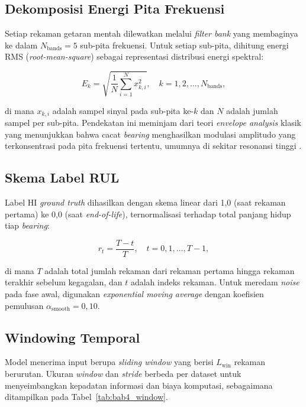 \subsection{Dekomposisi Energi Pita Frekuensi}
\label{subsec:bab4_bandenergi}

Setiap rekaman getaran mentah dilewatkan melalui \emph{filter bank} yang
membaginya ke dalam $N_{\text{bands}} = 5$ sub-pita frekuensi.
Untuk setiap sub-pita, dihitung energi RMS (\emph{root-mean-square})
sebagai representasi distribusi energi spektral:

\begin{equation}\label{eq:bab4_band_energy}
E_{k} = \sqrt{\frac{1}{N}\sum_{i=1}^{N} x_{k,i}^{2}}, \quad k = 1, 2, \ldots, N_{\text{bands}},
\end{equation}

\noindent di mana $x_{k,i}$ adalah sampel sinyal pada sub-pita ke-$k$
dan $N$ adalah jumlah sampel per sub-pita.
Pendekatan ini meminjam dari teori \emph{envelope analysis} klasik yang
menunjukkan bahwa cacat \emph{bearing} menghasilkan modulasi amplitudo yang
terkonsentrasi pada pita frekuensi tertentu, umumnya di sekitar resonansi
tinggi .

\subsection{Skema Label RUL}
\label{subsec:bab4_label}

Label HI \emph{ground truth} dihasilkan dengan skema linear dari 1{,}0
(saat rekaman pertama) ke 0{,}0 (saat \emph{end-of-life}), ternormalisasi
terhadap total panjang hidup tiap \emph{bearing}:

\begin{equation}\label{eq:bab4_rul_linear}
r_{t} = \frac{T - t}{T}, \quad t = 0, 1, \ldots, T-1,
\end{equation}

\noindent di mana $T$ adalah total jumlah rekaman dari rekaman pertama
hingga rekaman terakhir sebelum kegagalan, dan $t$ adalah indeks rekaman.
Untuk meredam \emph{noise} pada fase awal, digunakan \emph{exponential
moving average} dengan koefisien pemulusan $\alpha_{\text{smooth}} = 0{,}10$.

\subsection{Windowing Temporal}
\label{subsec:bab4_window}

Model menerima input berupa \emph{sliding window} yang berisi
$L_{\text{win}}$ rekaman berurutan.
Ukuran \emph{window} dan \emph{stride} berbeda per dataset untuk
menyeimbangkan kepadatan informasi dan biaya komputasi, sebagaimana
ditampilkan pada Tabel~\ref{tab:bab4_window}.

